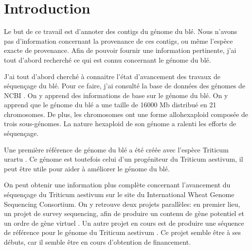 \documentclass[10.9pt]{article} %
\begin{document}

\tableofcontents %

\newpage %


\section{Introduction}

Le but de ce travail est d'annoter des contigs du génome du blé. Nous n'avons pas d'information concernant
la provenance de ces contigs, ou même l'espèce exacte de provenance. Afin de pouvoir fournir une information 
pertinente, j'ai tout d'abord recherché ce qui est connu concernant le génome du blé.

J'ai tout d'abord cherché à connaitre l'état d'avancement des travaux de séquençage du blé. Pour ce faire, j'ai consulté
la base de données des génomes de NCBI \cite{Triticum eastivum Genome}. On y apprend des informations de base sur le
génome du blé. On y apprend que le génome du blé a une taille de 16000 Mb distribué en 21 chromosomes. De plus, les chromosomes
ont une forme allohexaploid composée de trois sous-génomes. La nature hexaploid de son génome a ralenti les efforts de séquençage.

Une première référence de génome du blé a été créée avec l'espèce Triticum urartu \cite{Triticum urartu}. Ce génome est toutefois
celui d'un progéniteur du Triticum aestivum, il peut être utile pour aider à améliorer le génome du blé.

On peut obtenir une information plus complète concernant l'avancement du séquençage du Triticum aestivum sur le site du International
Wheat Genome Sequencing Consortium. On y retrouve deux projets parallèles: en premier lieu, un projet de survey sequencing, afin de
produire un contenu de gène potentiel et un ordre de gène virtuel \cite{IWGSC-survey}. Un autre projet en cours est de produire une
séquence de référence pour le génome du Triticum aestivum \cite{IWGSC-reference}. Ce projet semble être à ses débuts, car il semble
être en cours d'obtention de financement.
\end{document}
